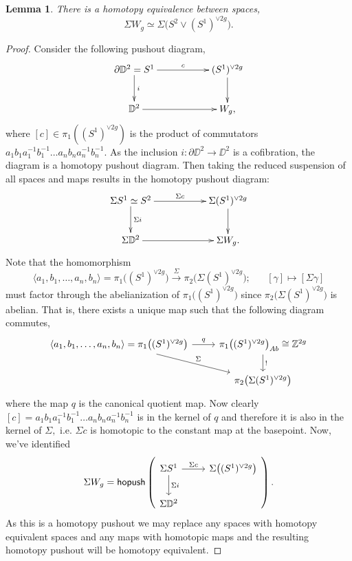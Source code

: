\documentclass{amsart}
\newtheorem{lemma}[theorem]{Lemma}
\theoremstyle{definition}
\theoremstyle{remark}
\newcommand{\xra}{\xrightarrow}
\begin{document}
\begin{lemma} \label{gc}
There is a homotopy equivalence between spaces,
$$\Sigma W_{g} \simeq \Sigma \big( S^{2} \vee (S^{1})^{\vee 2g}\big). $$
\end{lemma}
\begin{proof}
Consider the following pushout diagram,
$$
\xymatrix{
\partial \DD^{2} = S^{1} \ar[rr]^-{c} \ar[d]^-{i}
&&
(S^{1})^{\vee 2g} \ar[d]^-{}
\\
\DD^{2} \ar[rr]^-{} 
&&
W_{g},
}$$ 
where $[c] \in \pi_{1}((S^{1})^{\vee 2g})$ is the product of commutators $a_{1}b_{1}a_{1}^{-1}b_{1}^{-1} \hdots a_{n}b_{n}a_{n}^{-1}b_{n}^{-1}.$ As the inclusion $i: \partial \DD^{2} \rightarrow \DD^{2}$ is a cofibration, the diagram is a homotopy pushout diagram. Then taking the reduced suspension of all spaces and maps results in the homotopy pushout diagram:
$$
\xymatrix{
\Sigma S^{1} \simeq S^{2} \ar[rr]^-{\Sigma c} \ar[d]^-{\Sigma i}
&&
\Sigma (S^{1})^{\vee 2g} \ar[d]^-{}
\\
\Sigma \DD^{2} \ar[rr]^-{} 
&&
\Sigma W_{g}.
}$$  
Note that the homomorphism $$\langle a_{1}, b_{1}, \hdots, a_{n}, b_{n} \rangle = \pi_{1}\big((S^{1})^{\vee 2g}\big) \xra{\Sigma} \pi_{2}\big(\Sigma(S^{1})^{\vee 2g}\big); \hspace{20pt}  [\gamma] \mapsto [\Sigma \gamma]$$ must factor through the abelianization of $\pi_{1}\big((S^{1})^{\vee 2g}\big)$ since $\pi_{2}\big(\Sigma(S^{1})^{\vee 2g}\big)$ is abelian. That is, there exists a unique map such that the following diagram commutes,
$$\begin{tikzcd}
\langle a_{1}, b_{1}, \hdots, a_{n}, b_{n} \rangle = \pi_{1}\big((S^{1})^{\vee 2g}\big) \arrow[r, "q"] \arrow[rd, "\Sigma"]
&  \pi_{1}\big((S^{1})^{\vee 2g}\big)_{Ab} \cong \ZZ^{2g} \arrow[d, "!"] \\
&  \pi_{2}\big(\Sigma(S^{1})^{\vee 2g}\big)
\end{tikzcd}$$
where the map $q$ is the canonical quotient map. Now clearly $[c] = a_{1}b_{1}a_{1}^{-1}b_{1}^{-1} \hdots a_{n}b_{n}a_{n}^{-1}b_{n}^{-1}$ is in the kernel of $q$ and therefore it is also in the kernel of $\Sigma,$ i.e. $\Sigma c$ is homotopic to the constant map at the basepoint.
Now, we've identified $$\Sigma W_{g} = {\sf hopush} \left( \begin{tikzcd}
\Sigma S^{1} \arrow[r, "\Sigma c"] \arrow[d, "\Sigma i"] & \Sigma\big( (S^{1})^{\vee 2g} \big) \\
\Sigma \DD^{2}
\end{tikzcd} \right).$$ As this is a homotopy pushout we may replace any spaces with homotopy equivalent spaces and any maps with homotopic maps and the resulting homotopy pushout will be homotopy equivalent. 

\end{proof}
\end{document}
